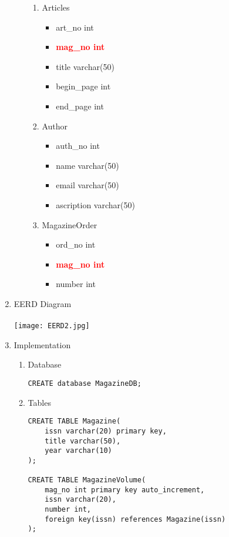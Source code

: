 \documentclass[]{article}
\begin{document}
\begin{enumerate}
\begin{enumerate}
\begin{enumerate}
\item Articles
\begin{itemize}
\item art\_no int
\item \textcolor{red}{\textbf{mag\_no int}}
\item title varchar(50)
\item begin\_page int
\item end\_page int
\end{itemize}

\item Author
\begin{itemize}
\item auth\_no int
\item name varchar(50)
\item email varchar(50)
\item ascription varchar(50)
\end{itemize}

\item MagazineOrder
\begin{itemize}
\item ord\_no int
\item \textcolor{red}{\textbf{mag\_no int}}
\item number int
\end{itemize}
\end{enumerate}

\end{enumerate}

\item EERD Diagram
\\\\
\texttt{[image: EERD2.jpg]}
\\
\item Implementation

\begin{enumerate}
\item Database
\begin{verbatim}
CREATE database MagazineDB;
\end{verbatim}

\item Tables
\begin{verbatim}
CREATE TABLE Magazine(
	issn varchar(20) primary key,
	title varchar(50),
	year varchar(10)
);

CREATE TABLE MagazineVolume(
	mag_no int primary key auto_increment,
	issn varchar(20),
	number int,
	foreign key(issn) references Magazine(issn)
);


\end{verbatim}
\end{enumerate}
\end{enumerate}
\end{document}
